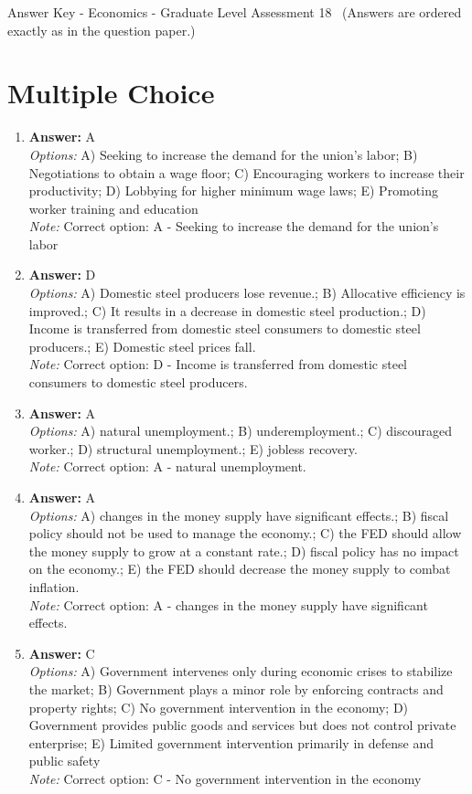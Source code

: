 \documentclass[12pt]{article}
\begin{document}
\begin{center}
Answer Key - Economics - Graduate Level Assessment 18 \
\small (Answers are ordered exactly as in the question paper.)
\end{center}

\section*{Multiple Choice}
\begin{enumerate}[label=\arabic*.]
\item \textbf{Answer:} A
\\ \textit{Options:} A) Seeking to increase the demand for the union's labor; B) Negotiations to obtain a wage floor; C) Encouraging workers to increase their productivity; D) Lobbying for higher minimum wage laws; E) Promoting worker training and education
\\ \textit{Note:} Correct option: A - Seeking to increase the demand for the union's labor
\item \textbf{Answer:} D
\\ \textit{Options:} A) Domestic steel producers lose revenue.; B) Allocative efficiency is improved.; C) It results in a decrease in domestic steel production.; D) Income is transferred from domestic steel consumers to domestic steel producers.; E) Domestic steel prices fall.
\\ \textit{Note:} Correct option: D - Income is transferred from domestic steel consumers to domestic steel producers.
\item \textbf{Answer:} A
\\ \textit{Options:} A) natural unemployment.; B) underemployment.; C) discouraged worker.; D) structural unemployment.; E) jobless recovery.
\\ \textit{Note:} Correct option: A - natural unemployment.
\item \textbf{Answer:} A
\\ \textit{Options:} A) changes in the money supply have significant effects.; B) fiscal policy should not be used to manage the economy.; C) the FED should allow the money supply to grow at a constant rate.; D) fiscal policy has no impact on the economy.; E) the FED should decrease the money supply to combat inflation.
\\ \textit{Note:} Correct option: A - changes in the money supply have significant effects.
\item \textbf{Answer:} C
\\ \textit{Options:} A) Government intervenes only during economic crises to stabilize the market; B) Government plays a minor role by enforcing contracts and property rights; C) No government intervention in the economy; D) Government provides public goods and services but does not control private enterprise; E) Limited government intervention primarily in defense and public safety
\\ \textit{Note:} Correct option: C - No government intervention in the economy
\end{enumerate}
\end{document}
